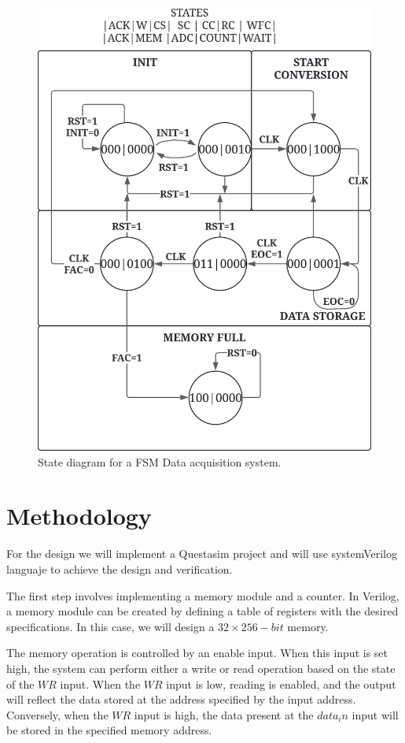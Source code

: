 \documentclass[conference]{IEEEtran}
\begin{document}
	\begin{figure}
		\centering
		\includegraphics[width=0.9\columnwidth]{"Files/State diagram"}
		\caption{State diagram for a FSM Data acquisition system.}
		\label{fig:state-diagram}
	\end{figure}
	
	\section{Methodology}
	For the design we will implement a Questasim project and will use systemVerilog languaje to achieve the design and verification.
	
	The first step involves implementing a memory module and a counter. In Verilog, a memory module can be created by defining a table of registers with the desired specifications. In this case, we will design a $32×256-bit$ memory.
	
	The memory operation is controlled by an enable input. When this input is set high, the system can perform either a write or read operation based on the state of the 
	$WR$ input. When the $WR$ input is low, reading is enabled, and the output will reflect the data stored at the address specified by the input address. Conversely, when the $WR$ input is high, the data present at the $data_in$ input will be stored in the specified memory address.
	
\end{document}

